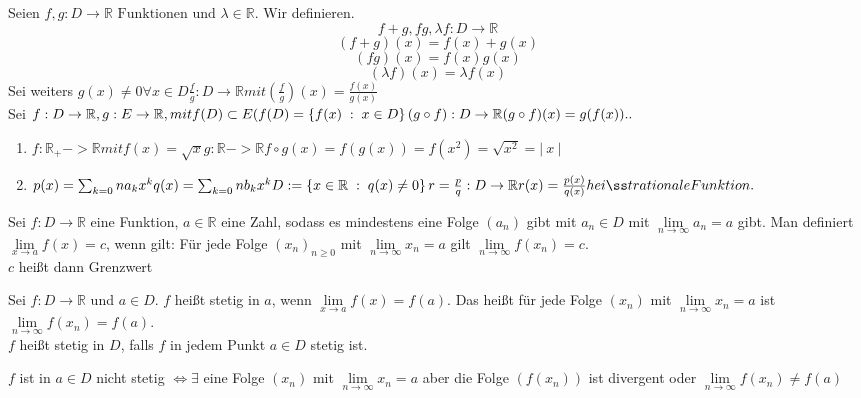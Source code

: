 \documentclass[a4paper,titlepage,oneside]{article}
\def\R{\ensuremath{\mathbb{R}} }
\def\sp{\hspace{0,1cm}}
\renewcommand{\liminf}[2][n]{\ensuremath{\lim\limits_{#1 \rightarrow \infty}{#2}}}
\newcommand{\abs}[1]{\ensuremath{\left|\:#1\:\right|}}
\newcommand{\menge}[2]{\ensuremath{\left\{#1\sp : \sp #2\right\}}}
\theoremstyle{thmstyle}
\begin{document}
\begin{defi}
Seien $f,g : D \to \R \text{ Funktionen und } \lambda \in \R.$ Wir definieren.
\[f+ g, f  g, \lambda f : D \to \R \]
\[(f+g)(x) = f(x) + g(x)\]
\[(fg)(x) = f(x) g(x)\]
\[(\lambda f)(x) = \lambda f(x) \]
Sei weiters $g(x) \ne 0 \forall x \in D
\frac{f}{g} : D \to \R mit \left(\frac{f}{g}\right)(x) = \frac{f(x)}{g(x)} $\\
Sei $ f: D \to \R, g: E \to \R, mit f(D) \subset E (f(D) = \menge{f(x)}{x \in D}
(g  \circ  f)  :  D \to \R
(g  \circ  f)(x) = g(f(x)) ..$
\end{defi}

\begin{bsp}
\begin{enumerate}
\item $f: \R_+ -> \R mit f(x) = \sqrt{x}
 g: \R -> \R
 f \circ g(x) = f(g(x)) = f(x^2) = \sqrt{x^2} = \abs{x}$
\item $
 p(x) = \sum_{k=0}{n}{a_kx^k}
 q(x) = \sum_{k=0}{n}{b_kx^k}
 D:= \menge{x\in \R}{q(x) \ne 0}
 r = \frac{p}{q} : D \to \R
 r(x) = \frac{p(x)}{q(x)} heißt rationale Funktion.$
\end{enumerate}
\end{bsp}

\begin{defi}
Sei $f : D \to \R$ eine Funktion, $a \in \R$ eine Zahl, sodass es mindestens eine Folge $(a_n)$ gibt mit $a_n \in D$ mit $\liminf{a_n} = a $ gibt. Man definiert \(\lim\limits_{x \to a}{ f(x)} = c\), wenn gilt: Für jede Folge $(x_n)_{n\ge0}$ mit $\liminf{x_n} = a$  gilt $\liminf{f(x_n)} = c$.\\
$c$ heißt dann Grenzwert
\end{defi}

\begin{defi}[Stetigkeit]
Sei $f: D \to \R$ und $a \in D$. $f$ heißt stetig in $a$, wenn \(\lim\limits_{x \to a}{f(x)} = f(a)\). Das heißt für jede Folge $(x_n)$ mit $\liminf{x_n} = a$ ist $\liminf{f(x_n)} = f(a)$.\\
$f$ heißt stetig in $D$, falls $f$ in jedem Punkt $a \in D$ stetig ist.
\end{defi}

\begin{bem}
$f$ ist in $a \in D$ nicht stetig $\Leftrightarrow \exists$ eine Folge $(x_n)$ mit $\liminf{x_n} = a$ aber die Folge $(f(x_n))$ ist divergent oder $\liminf{f(x_n)} \ne f(a)$
\end{bem}
\end{document}
